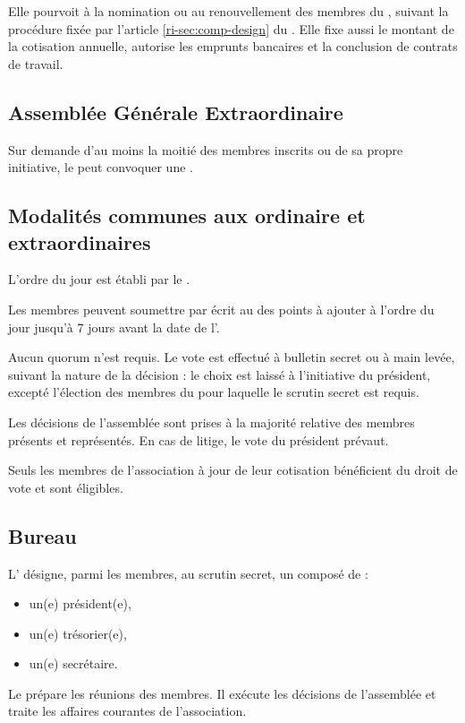 \documentclass[a4paper,french,10pt]{article}
\newcommand{\article}[1]{\subsection{#1}\addtocounter{article}{1}}
\newcounter{article}
\newcommand{\artrefri}[1]{article \ref{ri-#1} du \RI{}}
\begin{document}
Elle pourvoit à la nomination ou au renouvellement des membres du \bureau{}, suivant la procédure fixée par l'\artrefri{sec:comp-design}. Elle fixe aussi le montant de la cotisation annuelle, autorise les emprunts bancaires et la conclusion de contrats de travail.


\article{Assemblée Générale Extraordinaire}
\label{sec:age}

Sur demande d'au moins la moitié des membres inscrits ou de sa propre initiative, le \bureau{} peut convoquer une \AGE{}.

\article{Modalités communes aux \AG{} ordinaire et extraordinaires}
\label{sec:ag}
L'ordre du jour est établi par le \bureau{}. %

Les membres peuvent soumettre par écrit au \bureau{} des points à ajouter à l'ordre du jour jusqu'à 7 jours avant la date de l'\AG{}.


Aucun quorum n'est requis. Le vote est effectué à bulletin secret ou à
main levée, suivant la nature de la décision : le choix est laissé à
l'initiative du président, excepté l'élection des membres du \bureau{}
pour laquelle le scrutin secret est requis.

Les décisions de l’assemblée sont prises à la majorité relative des
membres présents et représentés. En cas de litige, le vote du
président prévaut.

Seuls les membres de l’association à jour de leur cotisation
bénéficient du droit de vote et sont éligibles.





\article{Bureau}
\label{sec:bureau}
L’\AG{} désigne, parmi les membres, au scrutin secret, un
\bureau{} composé de :
\begin{itemize}
\item un(e) président(e),
  
\item un(e) trésorier(e),

\item un(e) secrétaire.
\end{itemize}

Le \bureau{} prépare les réunions des membres. Il exécute les décisions de l’assemblée et traite les affaires courantes de l’association.
\end{document}
